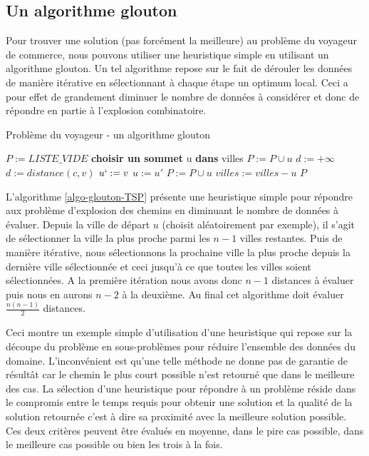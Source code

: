\subsection{Un algorithme glouton}
Pour trouver une solution (pas forcément la meilleure) au problème du voyageur de commerce, nous pouvons utiliser une heuristique simple en utilisant un algorithme glouton. Un tel algorithme repose sur le fait de dérouler les données de manière itérative en sélectionnant à chaque étape un optimum local. Ceci a pour effet de grandement diminuer le nombre de données à considérer et donc de répondre en partie à l'explosion combinatoire.

\begin{algorithm}
\caption{Problème du voyageur - un algorithme glouton} 
\label{algo-glouton-TSP}
\begin{algorithmic}
    \State $P := LISTE\_VIDE$
    \State \textbf{choisir un sommet} u \textbf{dans} villes
    \State $P := P \cup u$
        \State $d := +\infty$
                \State $d := distance(c, v)$
                \State $u` := v$
            \EndIf
        \EndFor
        \State $u := u'$
        \State $P := P \cup u$
        \State $villes := villes - u$
    \EndWhile
    \State \Return $P$
\EndFunction
\end{algorithmic}
\end{algorithm}

L'algorithme \ref{algo-glouton-TSP} présente une heuristique simple pour répondre aux problème d'explosion des chemins en diminuant le nombre de données à évaluer. 
Depuis la ville de départ $u$ (choisit aléatoirement par exemple), il s'agit de sélectionner la ville la plus proche parmi les $n-1$ villes restantes. Puis de manière itérative, nous sélectionnons la prochaine ville la plus proche depuis la dernière ville sélectionnée et ceci jusqu'à ce que toutes les villes soient sélectionnées. 
A la première itération nous avons donc $n-1$ distances à évaluer puis nous en aurons $n-2$ à la deuxième. Au final cet algorithme doit évaluer $\frac{n(n-1)}{2}$ distances. 

\newpage

Ceci montre un exemple simple d'utilisation d'une heuristique qui repose sur la découpe du problème en sous-problèmes pour réduire l'ensemble des données du domaine. L'inconvénient est qu'une telle méthode ne donne pas de garantie de résultât car le chemin le plus court possible n'est retourné que dans le meilleure des cas.
La sélection d'une heuristique pour répondre à un problème réside dans le compromis entre le temps requis pour obtenir une solution et la qualité de la solution retournée c'est à dire sa proximité avec la meilleure solution possible. 
Ces deux critères peuvent être évalués en moyenne, dans le pire cas possible, dans le meilleure cas possible ou bien les trois à la fois. \\

